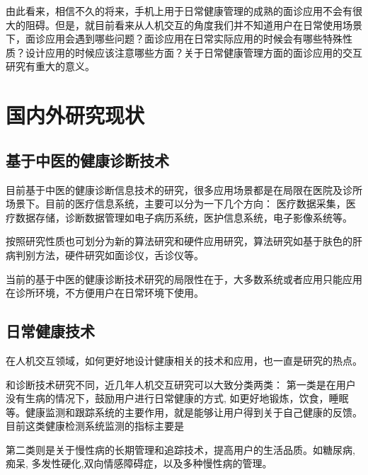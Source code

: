 由此看来，相信不久的将来，手机上用于日常健康管理的成熟的面诊应用不会有很大的阻碍。但是，就目前看来从人机交互的角度我们并不知道用户在日常使用场景下，面诊应用会遇到哪些问题？面诊应用在日常实际应用的时候会有哪些特殊性质？设计应用的时候应该注意哪些方面？关于日常健康管理方面的面诊应用的交互研究有重大的意义。

\section{国内外研究现状}

\subsection{基于中医的健康诊断技术}

目前基于中医的健康诊断信息技术的研究，很多应用场景都是在局限在医院及诊所场景下。目前的医疗信息系统，主要可以分为一下几个方向：
医疗数据采集，医疗数据存储，诊断数据管理如电子病历系统，医护信息系统，电子影像系统等。

按照研究性质也可划分为新的算法研究和硬件应用研究，算法研究如基于肤色的肝病判别方法，硬件研究如面诊仪，舌诊仪等。


当前的基于中医的健康诊断技术研究的局限性在于，大多数系统或者应用只能应用在诊所环境，不方便用户在日常环境下使用。

\subsection{日常健康技术}

在人机交互领域，如何更好地设计健康相关的技术和应用，也一直是研究的热点。

和诊断技术研究不同，近几年人机交互研究可以大致分类两类： 第一类是在用户没有生病的情况下，鼓励用户进行日常健康的方式, 如更好地锻炼，饮食，睡眠等。健康监测和跟踪系统的主要作用，就是能够让用户得到关于自己健康的反馈。目前这类健康检测系统监测的指标主要是

第二类则是关于慢性病的长期管理和追踪技术，提高用户的生活品质。如糖尿病\cite{mamykina2008mahi:}, 痴呆\cite{yasuda2009remote}, 多发性硬化\cite{ayobi2017quantifying},双向情感障碍症\cite{bardram2013designing}，以及多种慢性病的管理\cite{nunes2015self-care}。






